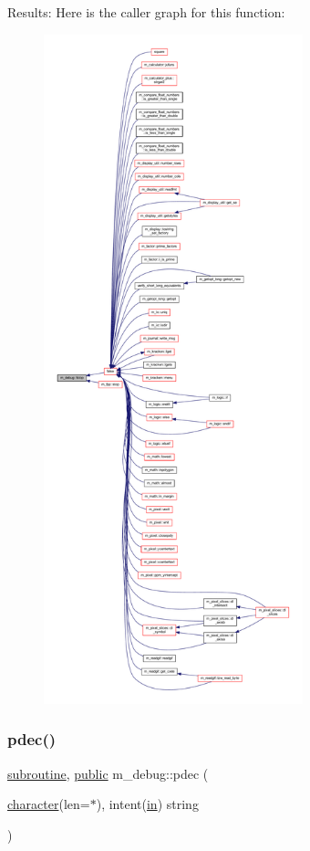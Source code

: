 Results\+: Here is the caller graph for this function\+:
\nopagebreak
\begin{figure}[H]
\begin{center}
\leavevmode
\includegraphics[height=550pt]{namespacem__debug_a66fa03a6a97837acc4c1265be1294295_icgraph}
\end{center}
\end{figure}
\mbox{\label{namespacem__debug_a9b456606b4c555ed2e1e453aa9c872cb}} 
\subsubsection{\texorpdfstring{pdec()}{pdec()}}
{\footnotesize\ttfamily \hyperlink{M__stopwatch_83_8txt_acfbcff50169d691ff02d4a123ed70482}{subroutine}, \hyperlink{M__stopwatch_83_8txt_a2f74811300c361e53b430611a7d1769f}{public} m\+\_\+debug\+::pdec (\begin{DoxyParamCaption}\item[{\hyperlink{option__stopwatch_83_8txt_abd4b21fbbd175834027b5224bfe97e66}{character}(len=$\ast$), intent(\hyperlink{M__journal_83_8txt_afce72651d1eed785a2132bee863b2f38}{in})}]{string }\end{DoxyParamCaption})}



